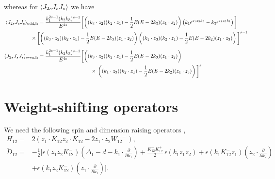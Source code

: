 \documentclass[a4paper,11pt]{article}
\begin{document}
whereas for $\ev{J_{2s} J_s J_s }$ we have
\begin{align}\label{spinsintermsofspin1d}
 \langle J_{2s} J_s J_s \rangle_{\text{odd},\mathbf{h}}&= \frac{k_1^{2s-1} (k_2 k_3)^{s-1}}{E^{4s}} \bigg[\bigg((k_3 \cdot z_2)(k_2 \cdot z_1)-\frac{1}{2}E(E-2k_3)(z_1 \cdot z_2)\bigg)\left( k_1\epsilon^{z_{1} z_{3} k_{3}}-  k_3  \epsilon^{z_{1} z_{3} k_{1}}\right)\bigg]\cr
 &\hspace{-0.5cm}\times\bigg[\bigg((k_3 \cdot z_2)(k_2 \cdot z_1)\bigg.\bigg.\bigg.\bigg.-\frac{1}{2}E(E-2k_3)(z_1 \cdot z_2)\bigg)\left((k_1 \cdot z_3)(k_2 \cdot z_1)-\frac{1}{2}E(E-2k_2)(z_1 \cdot z_3)\right)\bigg]^{s-1}\nonumber\\[5 pt]
     \langle J_{2s} J_s J_s \rangle_{\text{even},\mathbf{h}}&=\frac{k_1^{2s-1} (k_2 k_3)^{s-1}}{E^{4s}}\bigg[\bigg((k_3 \cdot z_2)(k_2 \cdot z_1)-\frac{1}{2}E(E-2k_3)(z_1 \cdot z_2)\bigg)\bigg.\cr 
     &\hspace{3.5cm}\times\bigg.\left((k_1 \cdot z_3)(k_2 \cdot z_1)-\frac{1}{2}E(E-2k_2)(z_1 \cdot z_3)\right)\bigg]^{s} 
\end{align}

\section{Weight-shifting operators}\label{sdro}
We need the following spin and dimension raising operators \cite{Baumann:2019oyu,Baumann:2020dch,Jain:2021wyn},
\begin{align}\label{wsoe}
    H_{12}=&2 \left(z_1\cdot K_{12}z_2\cdot K_{12}-2 z_1\cdot z_2 W_{12}^{--}\right),\nonumber\\
    \tilde{D}_{12}=&-\frac{1}{2}\Big[\epsilon(z_{1}z_{2}K^-_{12})(\Delta_1-d-k_1\cdot\frac{\partial}{\partial k_1}) +\frac{K_{12}^-K^+_{12}}{2}\,\epsilon(k_{1}z_{1}z_{2})+\epsilon(k_{1}K_{12}^-z_{1})(z_2\cdot \frac{\partial}{\partial k_2})\nonumber \\
    &+\epsilon(k_{1}z_{2}K^-_{12})(z_1\cdot\frac{\partial}{\partial k_1})\Big].
\end{align}
\end{document}
